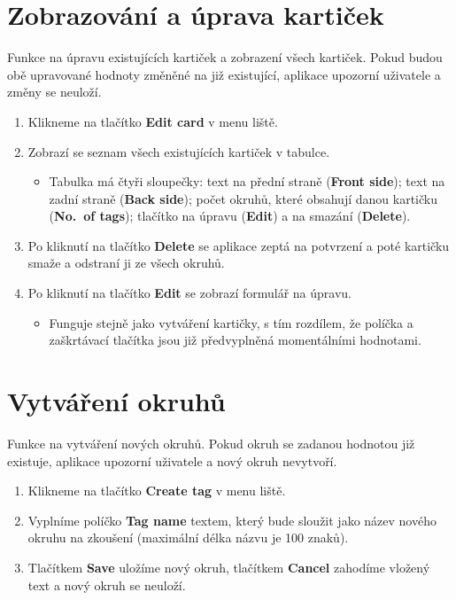 \documentclass[12pt]{article}
\providecommand{\tightlist}{\setlength{\itemsep}{1pt}\setlength{\parskip}{1pt}}
\begin{document}
\hypertarget{zobrazovuxe1nuxed-a-uxfaprava-kartiux10dek}{%
\section{Zobrazování a úprava
kartiček}\label{zobrazovuxe1nuxed-a-uxfaprava-kartiux10dek}}

Funkce na úpravu existujících kartiček a zobrazení všech kartiček. Pokud
budou obě upravované hodnoty změněné na již existující, aplikace
upozorní uživatele a změny se neuloží.

\begin{enumerate}
\def\labelenumi{\arabic{enumi}.}
\tightlist
\item
  Klikneme na tlačítko \textbf{Edit card} v menu liště.
\item
  Zobrazí se seznam všech existujících kartiček v tabulce.

  \begin{itemize}
  \tightlist
  \item
    Tabulka má čtyři sloupečky: text na přední straně (\textbf{Front
    side}); text na zadní straně (\textbf{Back side}); počet okruhů,
    které obsahují danou kartičku (\textbf{No.~of tags}); tlačítko na
    úpravu (\textbf{Edit}) a na smazání (\textbf{Delete}).
  \end{itemize}
\item
  Po kliknutí na tlačítko \textbf{Delete} se aplikace zeptá na potvrzení
  a poté kartičku smaže a odstraní ji ze všech okruhů.
\item
  Po kliknutí na tlačítko \textbf{Edit} se zobrazí formulář na úpravu.

  \begin{itemize}
  \tightlist
  \item
    Funguje stejně jako vytváření kartičky, s tím rozdílem, že políčka a
    zaškrtávací tlačítka jsou již předvyplněná momentálními hodnotami.
  \end{itemize}
\end{enumerate}

\hypertarget{vytvuxe1ux159enuxed-okruhux16f}{%
\section{Vytváření okruhů}\label{vytvuxe1ux159enuxed-okruhux16f}}

Funkce na vytváření nových okruhů. Pokud okruh se zadanou hodnotou již
existuje, aplikace upozorní uživatele a nový okruh nevytvoří.

\begin{enumerate}
\def\labelenumi{\arabic{enumi}.}
\tightlist
\item
  Klikneme na tlačítko \textbf{Create tag} v menu liště.
\item
  Vyplníme políčko \textbf{Tag name} textem, který bude sloužit jako
  název nového okruhu na zkoušení (maximální délka názvu je 100 znaků).
\item
  Tlačítkem \textbf{Save} uložíme nový okruh, tlačítkem \textbf{Cancel}
  zahodíme vložený text a nový okruh se neuloží.
\end{enumerate}
\end{document}
